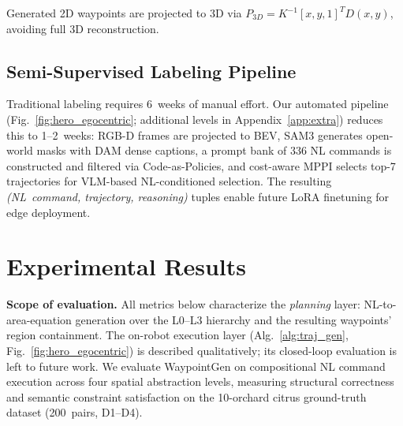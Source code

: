 \documentclass{article}
\begin{document}
Generated 2D waypoints are projected to 3D via $P_{3D} = K^{-1} [x, y, 1]^T D(x,y)$, avoiding full 3D reconstruction.


\subsection{Semi-Supervised Labeling Pipeline}
\label{sec:autolabel}

Traditional labeling requires 6~weeks of manual effort. Our automated pipeline (Fig.~\ref{fig:hero_egocentric}; additional levels in Appendix~\ref{app:extra}) reduces this to 1--2~weeks: RGB-D frames are projected to BEV, SAM3 generates open-world masks with DAM dense captions, a prompt bank of 336 NL commands is constructed and filtered via Code-as-Policies, and cost-aware MPPI selects top-7 trajectories for VLM-based NL-conditioned selection. The resulting \emph{(NL~command, trajectory, reasoning)} tuples enable future LoRA finetuning for edge deployment.



\section{Experimental Results}
\label{sec:experiments}

\textbf{Scope of evaluation.} All metrics below characterize the \emph{planning} layer: NL-to-area-equation generation over the L0--L3 hierarchy and the resulting waypoints' region containment. The on-robot execution layer (Alg.~\ref{alg:traj_gen}, Fig.~\ref{fig:hero_egocentric}) is described qualitatively; its closed-loop evaluation is left to future work.
We evaluate WaypointGen on compositional NL command execution across four spatial abstraction levels, measuring structural correctness and semantic constraint satisfaction on the 10-orchard citrus ground-truth dataset (200~pairs, D1--D4).
\end{document}
